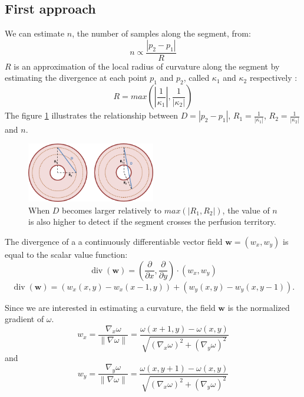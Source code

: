 \documentclass[11pt,a4paper]{article}
\newcommand{\mydiv}{\ensuremath{\operatorname{div}}}
\newcommand{\myvec}[1]{\ensuremath{\mathbf{#1}}}
\begin{document}
	\subsection{First approach} \label{firstaproach}

We can estimate $n$, the number of samples along the segment, from:
\begin{equation}
n \propto \frac{|p_2 - p_1|}{R}
\end{equation}
$R$ is an approximation of the local radius of curvature along the segment by estimating the divergence at each point $p_1$ and $p_2$, called $\kappa_1$ and $\kappa_2$ respectively :
\begin{equation}
R = max(|\frac{1}{\kappa_1}|, \frac{1}{|\kappa_2|})
\end{equation} 
The figure \ref{example} illustrates the relationship between $D = |p_2 - p_1|$, $R_1= \frac{1}{|\kappa_1|}$, $R_2=\frac{1}{|\kappa_2|}$ and $n$. 
\begin{figure}[h!]
\centering
\includegraphics[width=0.5\textwidth]{Drawings/CurvatureTestExample.png}
\caption{When $D$ becomes larger relatively to $max(|R_1, R_2|)$, the value of $n$ is also higher to detect if the segment crosses the perfusion territory.}
\label{example}
\end{figure}

The divergence of a a continuously differentiable vector field $\myvec{w}=(w_x,w_y)$ is equal to the scalar value function:
\begin{equation}
\mydiv (\myvec{w}) = (\frac{\partial}{\partial x}, \frac{\partial}{\partial y}) \cdot (w_x, w_y) 
\end{equation}
\begin{equation}
\mydiv (\myvec{w}) = \left( w_x(x, y) - w_x(x-1, y) \right) + \left( w_y(x, y) - w_y(x, y - 1) \right).
\end{equation}

Since we are interested in estimating a curvature, the field $\myvec{w}$ is the normalized gradient of $\omega$.
\begin{equation}
w_x = \frac{\nabla_x \omega}{\|\nabla \omega\|} = \frac{\omega (x + 1, y) - \omega (x, y)}{\sqrt{(\nabla_x\omega)^2 + (\nabla_y\omega)^2}}
\end{equation}
and
\begin{equation}
w_y = \frac{\nabla_y \omega}{\|\nabla \omega\|} = \frac{\omega (x, y + 1) - \omega (x, y)}{\sqrt{(\nabla_x\omega)^2 + (\nabla_y\omega)^2}}
\end{equation}	
\end{document}
